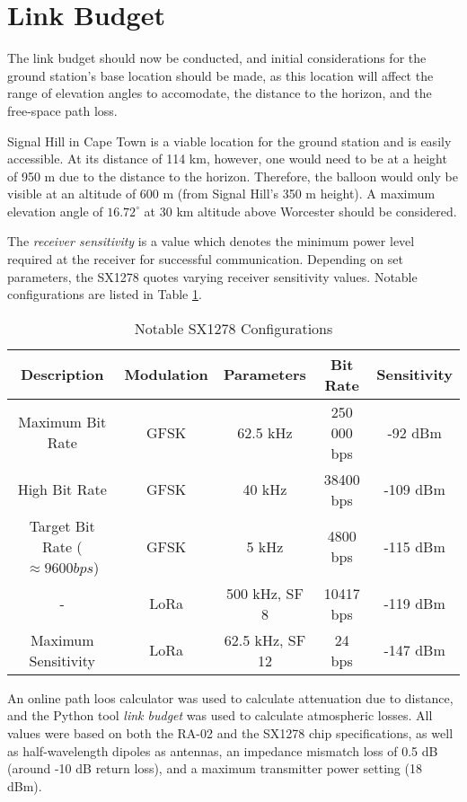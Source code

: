 \section{Link Budget}

The link budget should now be conducted, and initial considerations for the ground station's base location should be made, as this location will affect the range of elevation angles to accomodate, the distance to the horizon, and the free-space path loss.

Signal Hill in Cape Town is a viable location for the ground station and is easily accessible. At its distance of 114 km, however, one would need to be at a height of 950 m due to the distance to the horizon. Therefore, the balloon would only be visible at an altitude of 600 m (from Signal Hill's 350 m height). A maximum elevation angle of $16.72^\circ$ at 30 km altitude above Worcester should be considered.

\newpage
The \textit{receiver sensitivity} is a value which denotes the minimum power level required at the receiver for successful communication. Depending on set parameters, the SX1278 quotes varying receiver sensitivity values. Notable configurations are listed in Table \ref{tab:sensitivity_values}.
\begin{table}[!htb]
  \centering
  \renewcommand{\arraystretch}{1.2}
  \begin{tabular}{ |c|c|c|c|c| }
  \hline
  \textbf{Description} & \textbf{Modulation} & \textbf{Parameters} & \textbf{Bit Rate} & \textbf{Sensitivity} \\
  \hline
  Maximum Bit Rate &
  GFSK &
  62.5 kHz &
  250 000 bps &
  -92 dBm \\
  \hline
  High Bit Rate &
  GFSK &
  40 kHz &
  38400 bps &
  -109 dBm \\
  \hline
  Target Bit Rate ($\approx 9600 bps$) &
  GFSK &
  5 kHz &
  4800 bps &
  -115 dBm \\
  \hline
  - &
  LoRa &
  500 kHz, SF 8 &
  10417 bps &
  -119 dBm \\
  \hline
  Maximum Sensitivity &
  LoRa &
  62.5 kHz, SF 12 &
  24 bps &
  -147 dBm \\
  \hline
  \end{tabular}
  \caption{Notable SX1278 Configurations}
  \label{tab:sensitivity_values}
\end{table}

An online path loos calculator was used to calculate attenuation due to distance, and the Python tool \textit{link budget} was used to calculate atmospheric losses. All values were based on both the RA-02 and the SX1278 chip specifications, as well as half-wavelength dipoles as antennas, an impedance mismatch loss of 0.5 dB (around -10 dB return loss), and a maximum transmitter power setting (18 dBm).

